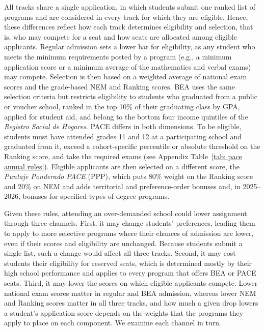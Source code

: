 

All tracks share a single application, in which students submit one ranked list of programs and are considered in every track for which they are eligible. Hence, these differences reflect how each track determines eligibility and selection, that is, who may compete for a seat and how seats are allocated among eligible applicants. Regular admission sets a lower bar for eligibility, as any student who meets the minimum requirements posted by a program (e.g., a minimum application score or a minimum average of the mathematics and verbal exams) may compete. Selection is then based on a weighted average of national exam scores and the grade-based NEM and Ranking scores. BEA uses the same selection criteria but restricts eligibility to students who graduated from a public or voucher school, ranked in the top 10\% of their graduating class by GPA, applied for student aid, and belong to the bottom four income quintiles of the \emph{Registro Social de Hogares}. PACE differs in both dimensions. To be eligible, students must have attended grades 11 and 12 at a participating school and graduated from it, exceed a cohort-specific percentile or absolute threshold on the Ranking score, and take the required exams (see Appendix Table~\ref{tab: pace annual rules}). Eligible applicants are then selected on a different score, the \emph{Puntaje Ponderado PACE} (PPP), which puts 80\% weight on the Ranking score and 20\% on NEM and adds territorial and preference-order bonuses and, in 2025--2026, bonuses for specified types of degree programs.

Given these rules, attending an over-demanded school could lower assignment through three channels. First, it may change students' preferences, leading them to apply to more selective programs where their chances of admission are lower, even if their scores and eligibility are unchanged. Because students submit a single list, such a change would affect all three tracks. Second, it may cost students their eligibility for reserved seats, which is determined mostly by their high school performance and applies to every program that offers BEA or PACE seats. Third, it may lower the scores on which eligible applicants compete. Lower national exam scores matter in regular and BEA admission, whereas lower NEM and Ranking scores matter in all three tracks, and how much a given drop lowers a student's application score depends on the weights that the programs they apply to place on each component. We examine each channel in turn.

